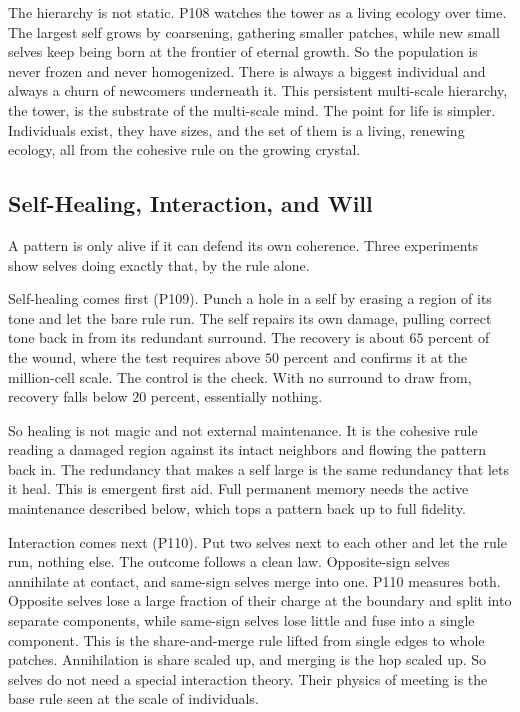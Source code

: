 The hierarchy is not static. P108 watches the tower as a living ecology over time. The largest self grows by coarsening, gathering smaller patches, while new small selves keep being born at the frontier of eternal growth. So the population is never frozen and never homogenized. There is always a biggest individual and always a churn of newcomers underneath it. This persistent multi-scale hierarchy, the tower, is the substrate of the multi-scale mind. The point for life is simpler. Individuals exist, they have sizes, and the set of them is a living, renewing ecology, all from the cohesive rule on the growing crystal.

\subsection{Self-Healing, Interaction, and Will}

A pattern is only alive if it can defend its own coherence. Three experiments show selves doing exactly that, by the rule alone.

Self-healing comes first (P109). Punch a hole in a self by erasing a region of its tone and let the bare rule run. The self repairs its own damage, pulling correct tone back in from its redundant surround. The recovery is about $65$ percent of the wound, where the test requires above $50$ percent and confirms it at the million-cell scale. The control is the check. With no surround to draw from, recovery falls below $20$ percent, essentially nothing.

So healing is not magic and not external maintenance. It is the cohesive rule reading a damaged region against its intact neighbors and flowing the pattern back in. The redundancy that makes a self large is the same redundancy that lets it heal. This is emergent first aid. Full permanent memory needs the active maintenance described below, which tops a pattern back up to full fidelity.

Interaction comes next (P110). Put two selves next to each other and let the rule run, nothing else. The outcome follows a clean law. Opposite-sign selves annihilate at contact, and same-sign selves merge into one. P110 measures both. Opposite selves lose a large fraction of their charge at the boundary and split into separate components, while same-sign selves lose little and fuse into a single component. This is the share-and-merge rule lifted from single edges to whole patches. Annihilation is share scaled up, and merging is the hop scaled up. So selves do not need a special interaction theory. Their physics of meeting is the base rule seen at the scale of individuals.

